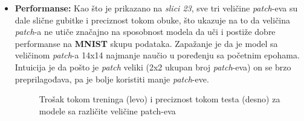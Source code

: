 \documentclass[12pt]{article}
\begin{document}
   \begin{itemize}
      \item \textbf{Performanse:} Kao što je prikazano na \textit{slici 23}, sve tri 
      veličine \textit{patch}-eva su dale slične gubitke i preciznost tokom obuke, što ukazuje 
      na to da veličina \textit{patch}-a ne utiče značajno na sposobnost modela da uči i 
      postiže dobre performanse na \textbf{MNIST} skupu podataka. Zapažanje je da je model sa
      veličinom \textit{patch}-a 14x14 najmanje naučio u poređenju sa početnim epohama. Intuicija
      je da pošto je \textit{patch} veliki (2x2 ukupan broj \textit{patch}-eva) on se brzo preprilagođava, pa
      je bolje koristiti manje \textit{patch}-eve. 
      \begin{figure}[h!]
         \centering
         \vspace{1cm} %
         \caption{Trošak tokom treninga (levo) i preciznost tokom testa (desno) za modele sa različite veličine patch-eva}
         \label{fig:exp3_metr}
      \end{figure}


\end{itemize}
\end{document}
